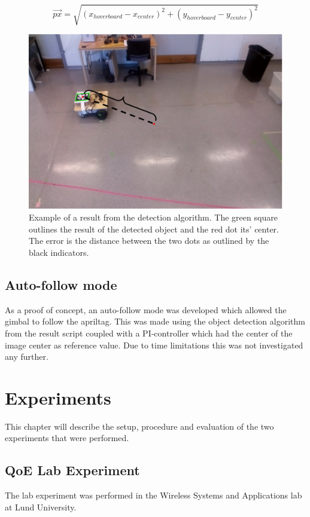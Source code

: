 \documentclass[nofilelist]{cslthse-msc}
\begin{document}
\begin{equation}
   \label{eq:distance}
   \overrightarrow{px} = \sqrt{(x_{hoverboard} - x_{center})^2 + (y_{hoverboard} - y_{center})^2}
\end{equation}


\begin{figure}[!hbt]
   \centering
   \includegraphics[scale=0.3]{images/resultcalc.png} 
   \caption{Example of a result from the detection algorithm. The green square outlines the result of the detected object and the red dot its' center. The error is the distance between the two dots as outlined by the black indicators.}
   \label{fig:resultcalc}
\end{figure}

\section{Auto-follow mode}
As a proof of concept, an auto-follow mode was developed which allowed the gimbal to follow the apriltag. This was made using the object detection algorithm from the result script coupled with a PI-controller which had the center of the image center as reference value. Due to time limitations this was not investigated any further.

\chapter{Experiments}
This chapter will describe the setup, procedure and evaluation of the two experiments that were performed.

\section{QoE Lab Experiment}
The lab experiment was performed in the Wireless Systems and Applications lab at Lund University. 
\end{document}
